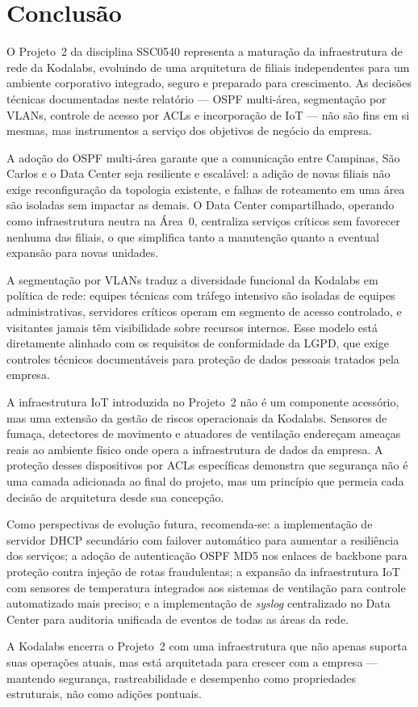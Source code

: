 \section{Conclusão}

O Projeto~2 da disciplina SSC0540 representa a maturação da infraestrutura de rede
da Kodalabs, evoluindo de uma arquitetura de filiais independentes para um ambiente
corporativo integrado, seguro e preparado para crescimento. As decisões técnicas
documentadas neste relatório — OSPF multi-área, segmentação por VLANs, controle de
acesso por ACLs e incorporação de IoT — não são fins em si mesmas, mas instrumentos
a serviço dos objetivos de negócio da empresa.

A adoção do OSPF multi-área garante que a comunicação entre Campinas, São Carlos e
o Data Center seja resiliente e escalável: a adição de novas filiais não exige
reconfiguração da topologia existente, e falhas de roteamento em uma área são
isoladas sem impactar as demais. O Data Center compartilhado, operando como
infraestrutura neutra na Área~0, centraliza serviços críticos sem favorecer
nenhuma das filiais, o que simplifica tanto a manutenção quanto a eventual expansão
para novas unidades.

A segmentação por VLANs traduz a diversidade funcional da Kodalabs em política de
rede: equipes técnicas com tráfego intensivo são isoladas de equipes administrativas,
servidores críticos operam em segmento de acesso controlado, e visitantes jamais
têm visibilidade sobre recursos internos. Esse modelo está diretamente alinhado com
os requisitos de conformidade da LGPD, que exige controles técnicos documentáveis
para proteção de dados pessoais tratados pela empresa.

A infraestrutura IoT introduzida no Projeto~2 não é um componente acessório, mas
uma extensão da gestão de riscos operacionais da Kodalabs. Sensores de fumaça,
detectores de movimento e atuadores de ventilação endereçam ameaças reais ao
ambiente físico onde opera a infraestrutura de dados da empresa. A proteção desses
dispositivos por ACLs específicas demonstra que segurança não é uma camada
adicionada ao final do projeto, mas um princípio que permeia cada decisão de
arquitetura desde sua concepção.

Como perspectivas de evolução futura, recomenda-se: a implementação de servidor
DHCP secundário com failover automático para aumentar a resiliência dos serviços;
a adoção de autenticação OSPF MD5 nos enlaces de backbone para proteção contra
injeção de rotas fraudulentas; a expansão da infraestrutura IoT com sensores de
temperatura integrados aos sistemas de ventilação para controle automatizado mais
preciso; e a implementação de \textit{syslog} centralizado no Data Center para
auditoria unificada de eventos de todas as áreas da rede.

A Kodalabs encerra o Projeto~2 com uma infraestrutura que não apenas suporta suas
operações atuais, mas está arquitetada para crescer com a empresa — mantendo
segurança, rastreabilidade e desempenho como propriedades estruturais, não como
adições pontuais.